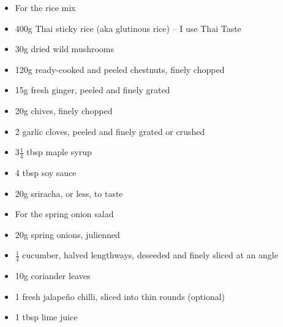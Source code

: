 \documentclass{book}
\begin{document}
\begin{itemize}
\item For the rice mix
\item 400g Thai sticky rice (aka glutinous rice) – I use Thai Taste
\item 30g dried wild mushrooms
\item 120g ready-cooked and peeled chestnuts, finely chopped
\item 15g fresh ginger, peeled and finely grated
\item 20g chives, finely chopped
\item 2 garlic cloves, peeled and finely grated or crushed
\item 3$\frac{1}{4}$ tbsp maple syrup
\item 4 tbsp soy sauce
\item 20g sriracha, or less, to taste
\end{itemize}

\begin{itemize}
\item For the spring onion salad
\item 20g spring onions, julienned
\item $\frac{1}{4}$ cucumber, halved lengthways, deseeded and finely sliced at an angle
\item 10g coriander leaves
\item 1 fresh jalapeño chilli, sliced into thin rounds (optional)
\item 1 tbsp lime juice
\end{itemize}
\end{document}
